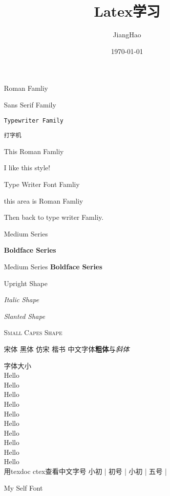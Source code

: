\documentclass[UTF8]{article}
\title{ Latex学习}
\author{JiangHao}
\date{\today}
\newcommand{\cwfont}{\ttfamily{\textbf{}}}
\begin{document}
    \textrm{Roman Famliy} 
    
    \textsf{Sans Serif Family} 

    \texttt{Typewriter Family}

    \texttt{打字机}

    \rmfamily %
    This Roman Famliy

    \sffamily
    I like this style!

    \ttfamily
    Type Writer Font Famliy

    {\rmfamily this area is Roman Famliy}
    
    Then back to type writer Famliy.

    \textmd {Medium Series}
    
    \textbf {Boldface Series}

    {\mdseries Medium Series}
    {\bfseries Boldface Series}

    {\upshape Upright Shape}

    {\itshape Italic Shape}

    {\slshape Slanted Shape}
    
    {\scshape Small Capes Shape}

    {\songti 宋体}\quad
    {\heiti 黑体}\quad
    {\fangsong 仿宋}\quad
    {\kaishu 楷书}\quad
    中文字体\textbf{粗体}与\textit{斜体}

    字体大小\\
    {\tiny Hello}\\
    {\scriptsize Hello}\\
    {\footnotesize Hello}\\
    {\small Hello}\\
    {\normalsize Hello}\\
    {\large Hello}\\
    {\Large Hello}\\
    {\LARGE Hello}\\
    {\huge Hello}\\
    {\Huge Hello}\\
    
    用texdoc ctex查看中文字号
     小初 |
     初号 |
     小初 |
     五号 |
    
    \cwfont My Self Font
\end{document}
